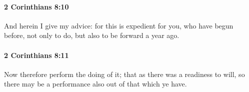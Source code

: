 		\paragraph{2 Corinthians 8:10} %
			\label{2CORINTHIANS-8-10}

			And herein I give my advice: for this is expedient for you, who have begun before, not only to do, but also to be forward a year ago.

			\begin{framed}
			\scriptsize
				\begin{compactdesc}
					\item[SBLG] 
				\end{compactdesc}
			\end{framed}

		\paragraph{2 Corinthians 8:11} %
			\label{2CORINTHIANS-8-11}

			Now therefore perform the doing of it; that as there was a readiness to will, so there may be a performance also out of that which ye have.

